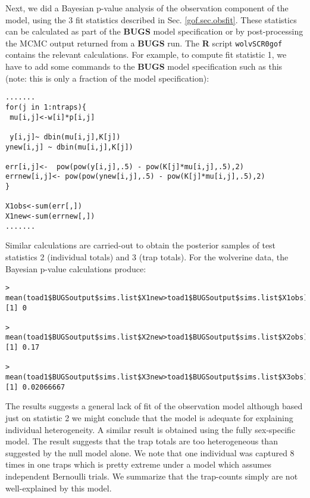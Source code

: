 Next, we did a Bayesian p-value analysis of the observation component
of the model, using the 3 fit statistics
described
in Sec. \ref{gof.sec.obsfit}.
These statistics can be calculated as part of
the {\bf BUGS} model specification or by post-processing the MCMC
output returned from a {\bf BUGS} run.
The {\bf R} script \mbox{\tt wolvSCR0gof} contains the relevant
calculations.  For example, to compute fit statistic 1, we have to add
some commands to the {\bf
  BUGS} model specification such as this (note: this is only a
fraction of the model specification):
\begin{verbatim}
.......
for(j in 1:ntraps){
 mu[i,j]<-w[i]*p[i,j]

 y[i,j]~ dbin(mu[i,j],K[j])
ynew[i,j] ~ dbin(mu[i,j],K[j])

err[i,j]<-  pow(pow(y[i,j],.5) - pow(K[j]*mu[i,j],.5),2)
errnew[i,j]<- pow(pow(ynew[i,j],.5) - pow(K[j]*mu[i,j],.5),2)
}

X1obs<-sum(err[,])
X1new<-sum(errnew[,])
.......
\end{verbatim}
Similar calculations are carried-out to obtain the posterior samples
of test statistics 2 (individual totals) and 3 (trap totals). For the
wolverine data, the Bayesian p-value calculations produce:
{\small
\begin{verbatim}
>  mean(toad1$BUGSoutput$sims.list$X1new>toad1$BUGSoutput$sims.list$X1obs)
[1] 0

>  mean(toad1$BUGSoutput$sims.list$X2new>toad1$BUGSoutput$sims.list$X2obs)
[1] 0.17

>  mean(toad1$BUGSoutput$sims.list$X3new>toad1$BUGSoutput$sims.list$X3obs)
[1] 0.02066667
\end{verbatim}
}
The results suggests a general lack of fit of the observation model
although based just on statistic  2 we might conclude that the model
is adequate for explaining individual heterogeneity.
A similar result is obtained using the fully sex-specific model.
The result  suggests that the trap totals are too
heterogeneous than suggested by the null model alone. We
note that one individual was captured 8 times in one traps which is
pretty extreme under a model which assumes independent Bernoulli
trials. We summarize that the trap-counts simply are not
well-explained by this model.

\begin{comment}
This produces:
\begin{verbatim}
fully sex-specific model:
>  mean(toad4$BUGSoutput$sims.list$X1new>toad4$BUGSoutput$sims.list$X1obs)
[1] 0
>  mean(toad4$BUGSoutput$sims.list$X2new>toad4$BUGSoutput$sims.list$X2obs)
[1] 0.234
>  mean(toad4$BUGSoutput$sims.list$X3new>toad4$BUGSoutput$sims.list$X3obs)
[1] 0.02133333
\end{verbatim}
which doesn't improve fit very much at all.
\end{comment}

